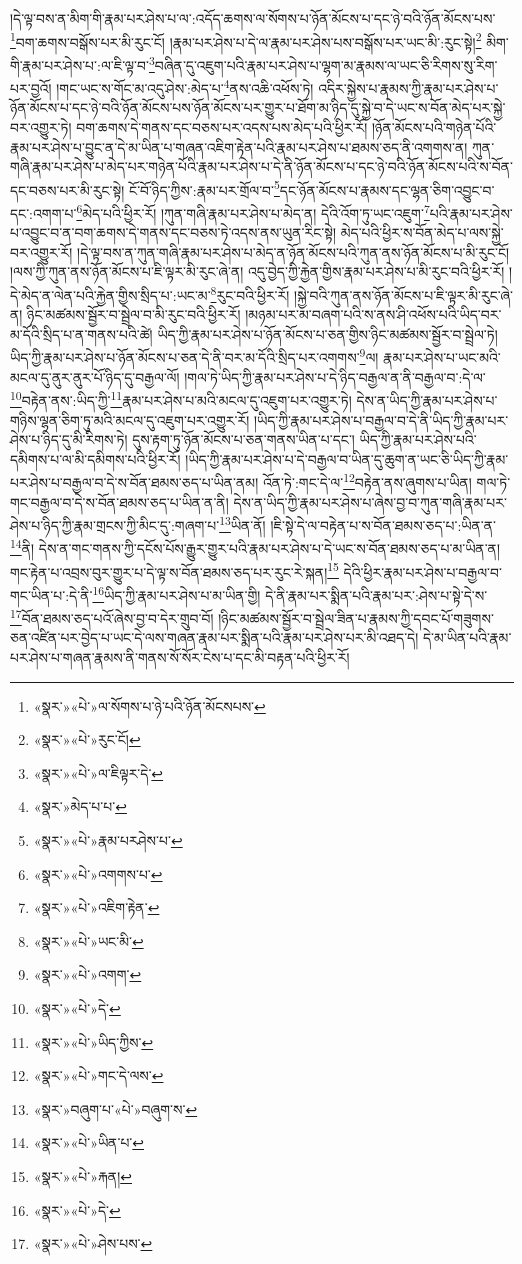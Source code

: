 །དེ་ལྟ་བས་ན་མིག་གི་རྣམ་པར་ཤེས་པ་ལ་:འདོད་ཆགས་ལ་སོགས་པ་ཉོན་མོངས་པ་དང་ཉེ་བའི་ཉོན་མོངས་པས་\footnote{«སྣར་»«པེ་»ལ་སོགས་པ་ཉེ་པའི་ཉོན་མོངསཔས་}བག་ཆགས་བསྒོས་པར་མི་རུང་ངོ། །རྣམ་པར་ཤེས་པ་དེ་ལ་རྣམ་པར་ཤེས་པས་བསྒོས་པར་ཡང་མི་:རུང་སྟེ།\footnote{«སྣར་»«པེ་»རུང་ངོ།} མིག་གི་རྣམ་པར་ཤེས་པ་:ལ་ཇི་ལྟ་བ་\footnote{«སྣར་»«པེ་»ལ་ཇིལྟར་དེ་}བཞིན་དུ་འཇུག་པའི་རྣམ་པར་ཤེས་པ་ལྷག་མ་རྣམས་ལ་ཡང་ཅི་རིགས་སུ་རིག་པར་བྱའོ། །གང་ཡང་ས་གོང་མ་འདུ་ཤེས་:མེད་པ་\footnote{«སྣར་»མེད་པ་པ་}ནས་འཆི་འཕོས་ཏེ། འདིར་སྐྱེས་པ་རྣམས་ཀྱི་རྣམ་པར་ཤེས་པ་ཉོན་མོངས་པ་དང་ཉེ་བའི་ཉོན་མོངས་པས་ཉོན་མོངས་པར་གྱུར་པ་ཐོག་མ་ཉིད་དུ་སྐྱེ་བ་དེ་ཡང་ས་བོན་མེད་པར་སྐྱེ་བར་འགྱུར་ཏེ། བག་ཆགས་དེ་གནས་དང་བཅས་པར་འདས་པས་མེད་པའི་ཕྱིར་རོ། །ཉོན་མོངས་པའི་གཉེན་པོའི་རྣམ་པར་ཤེས་པ་བྱུང་ན་དེ་མ་ཡིན་པ་གཞན་འཇིག་རྟེན་པའི་རྣམ་པར་ཤེས་པ་ཐམས་ཅད་ནི་འགགས་ན། ཀུན་གཞི་རྣམ་པར་ཤེས་པ་མེད་པར་གཉེན་པོའི་རྣམ་པར་ཤེས་པ་དེ་ནི་ཉོན་མོངས་པ་དང་ཉེ་བའི་ཉོན་མོངས་པའི་ས་བོན་དང་བཅས་པར་མི་རུང་སྟེ། ངོ་བོ་ཉིད་ཀྱིས་:རྣམ་པར་གྲོལ་བ་\footnote{«སྣར་»«པེ་»རྣམ་པརཤེས་པ་}དང་ཉོན་མོངས་པ་རྣམས་དང་ལྷན་ཅིག་འབྱུང་བ་དང་:འགག་པ་\footnote{«སྣར་»«པེ་»འགགས་པ་}མེད་པའི་ཕྱིར་རོ། །ཀུན་གཞི་རྣམ་པར་ཤེས་པ་མེད་ན། དེའི་འོག་ཏུ་ཡང་འཇུག་\footnote{«སྣར་»«པེ་»འཇིག་རྟེན་}པའི་རྣམ་པར་ཤེས་པ་འབྱུང་བ་ན་བག་ཆགས་དེ་གནས་དང་བཅས་ཏེ་འདས་ནས་ཡུན་རིང་སྟེ། མེད་པའི་ཕྱིར་ས་བོན་མེད་པ་ལས་སྐྱེ་བར་འགྱུར་རོ། །དེ་ལྟ་བས་ན་ཀུན་གཞི་རྣམ་པར་ཤེས་པ་མེད་ན་ཉོན་མོངས་པའི་ཀུན་ནས་ཉོན་མོངས་པ་མི་རུང་ངོ། །ལས་ཀྱི་ཀུན་ནས་ཉོན་མོངས་པ་ཇི་ལྟར་མི་རུང་ཞེ་ན། འདུ་བྱེད་ཀྱི་རྐྱེན་གྱིས་རྣམ་པར་ཤེས་པ་མི་རུང་བའི་ཕྱིར་རོ། །དེ་མེད་ན་ལེན་པའི་རྐྱེན་གྱིས་སྲིད་པ་:ཡང་མ་\footnote{«སྣར་»«པེ་»ཡང་མི་}རུང་བའི་ཕྱིར་རོ། །སྐྱེ་བའི་ཀུན་ནས་ཉོན་མོངས་པ་ཇི་ལྟར་མི་རུང་ཞེ་ན། ཉིང་མཚམས་སྦྱོར་བ་སྦྲེལ་བ་མི་རུང་བའི་ཕྱིར་རོ། །མཉམ་པར་མ་བཞག་པའི་ས་ནས་ཤི་འཕོས་པའི་ཡིད་བར་མ་དོའི་སྲིད་པ་ན་གནས་པའི་ཚེ། ཡིད་ཀྱི་རྣམ་པར་ཤེས་པ་ཉོན་མོངས་པ་ཅན་གྱིས་ཉིང་མཚམས་སྦྱོར་བ་སྦྲེལ་ཏེ། ཡིད་ཀྱི་རྣམ་པར་ཤེས་པ་ཉོན་མོངས་པ་ཅན་དེ་ནི་བར་མ་དོའི་སྲིད་པར་འགགས་\footnote{«སྣར་»«པེ་»འགག་}ལ། རྣམ་པར་ཤེས་པ་ཡང་མའི་མངལ་དུ་ནུར་ནུར་པོ་ཉིད་དུ་བརྒྱལ་ལོ། །གལ་ཏེ་ཡིད་ཀྱི་རྣམ་པར་ཤེས་པ་དེ་ཉིད་བརྒྱལ་ན་ནི་བརྒྱལ་བ་:དེ་ལ་\footnote{«སྣར་»«པེ་»དེ་}བརྟེན་ནས་:ཡིད་ཀྱི་\footnote{«སྣར་»«པེ་»ཡིད་ཀྱིས་}རྣམ་པར་ཤེས་པ་མའི་མངལ་དུ་འཇུག་པར་འགྱུར་ཏེ། དེས་ན་ཡིད་ཀྱི་རྣམ་པར་ཤེས་པ་གཉིས་ལྷན་ཅིག་ཏུ་མའི་མངལ་དུ་འཇུག་པར་འགྱུར་རོ། །ཡིད་ཀྱི་རྣམ་པར་ཤེས་པ་བརྒྱལ་བ་དེ་ནི་ཡིད་ཀྱི་རྣམ་པར་ཤེས་པ་ཉིད་དུ་མི་རིགས་ཏེ། དུས་རྟག་ཏུ་ཉོན་མོངས་པ་ཅན་གནས་ཡིན་པ་དང་། ཡིད་ཀྱི་རྣམ་པར་ཤེས་པའི་དམིགས་པ་ལ་མི་དམིགས་པའི་ཕྱིར་རོ། །ཡིད་ཀྱི་རྣམ་པར་ཤེས་པ་དེ་བརྒྱལ་བ་ཡིན་དུ་ཆུག་ན་ཡང་ཅི་ཡིད་ཀྱི་རྣམ་པར་ཤེས་པ་བརྒྱལ་བ་དེ་ས་བོན་ཐམས་ཅད་པ་ཡིན་ནམ། འོན་ཏེ་:གང་དེ་ལ་\footnote{«སྣར་»«པེ་»གང་དེ་ལས་}བརྟེན་ནས་ཞུགས་པ་ཡིན། གལ་ཏེ་གང་བརྒྱལ་བ་དེ་ས་བོན་ཐམས་ཅད་པ་ཡིན་ན་ནི། དེས་ན་ཡིད་ཀྱི་རྣམ་པར་ཤེས་པ་ཞེས་བྱ་བ་ཀུན་གཞི་རྣམ་པར་ཤེས་པ་ཉིད་ཀྱི་རྣམ་གྲངས་ཀྱི་མིང་དུ་:གཞག་པ་\footnote{«སྣར་»བཞུག་པ་«པེ་»བཞུག་ས་}ཡིན་ནོ། །ཇི་སྟེ་དེ་ལ་བརྟེན་པ་ས་བོན་ཐམས་ཅད་པ་:ཡིན་ན་\footnote{«སྣར་»«པེ་»ཡིན་པ་}ནི། དེས་ན་གང་གནས་ཀྱི་དངོས་པོས་རྒྱུར་གྱུར་པའི་རྣམ་པར་ཤེས་པ་དེ་ཡང་ས་བོན་ཐམས་ཅད་པ་མ་ཡིན་ན། གང་རྟེན་པ་འབྲས་བུར་གྱུར་པ་དེ་ལྟ་ས་བོན་ཐམས་ཅད་པར་རུང་རེ་སྐན།\footnote{«སྣར་»«པེ་»རྐན།} དེའི་ཕྱིར་རྣམ་པར་ཤེས་པ་བརྒྱལ་བ་གང་ཡིན་པ་:དེ་ནི་\footnote{«སྣར་»«པེ་»དེ་}ཡིད་ཀྱི་རྣམ་པར་ཤེས་པ་མ་ཡིན་གྱི། དེ་ནི་རྣམ་པར་སྨིན་པའི་རྣམ་པར་:ཤེས་པ་སྟེ་དེ་ས་\footnote{«སྣར་»«པེ་»ཤེས་པས་}བོན་ཐམས་ཅད་པའོ་ཞེས་བྱ་བ་དེར་གྲུབ་བོ། །ཉིང་མཚམས་སྦྱོར་བ་སྦྲེལ་ཟིན་པ་རྣམས་ཀྱི་དབང་པོ་གཟུགས་ཅན་འཛིན་པར་བྱེད་པ་ཡང་དེ་ལས་གཞན་རྣམ་པར་སྨིན་པའི་རྣམ་པར་ཤེས་པར་མི་འཐད་དེ། དེ་མ་ཡིན་པའི་རྣམ་པར་ཤེས་པ་གཞན་རྣམས་ནི་གནས་སོ་སོར་ངེས་པ་དང་མི་བརྟན་པའི་ཕྱིར་རོ། 